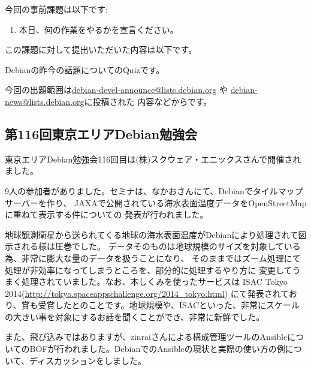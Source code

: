\documentclass[mingoth,a4paper]{jsarticle}
\begin{document}

今回の事前課題は以下です:
\begin{enumerate}
 \item 本日、何の作業をやるかを宣言ください。
\end{enumerate}
この課題に対して提出いただいた内容は以下です。
\begin{multicols}{2}
{\small

}
\end{multicols}


 Debianの昨今の話題についてのQuizです。

今回の出題範囲は\url{debian-devel-announce@lists.debian.org} や \url{debian-news@lists.debian.org}に投稿された
内容などからです。

\begin{multicols}{2}

\end{multicols}


\subsection{第116回東京エリアDebian勉強会}

 東京エリアDebian勉強会116回目は(株)スクウェア・エニックスさんで開催されました。
 
 9人の参加者がありました。セミナは、なかおさんにて、Debianでタイルマップサーバーを作り、
JAXAで公開されている海水表面温度データをOpenStreetMapに重ねて表示する件についての
発表が行われました。

 地球観測衛星から送られてくる地球の海水表面温度がDebianにより処理されて図示される様は圧巻でした。
データそのものは地球規模のサイズを対象している為、非常に膨大な量のデータを扱うことになり、
そのままではズーム処理にて処理が非効率になってしまうところを、部分的に処理するやり方に
変更してうまく処理されていました。なお、本しくみを使ったサービスは
ISAC Tokyo 2014(\url{http://tokyo.spaceappschallenge.org/2014_tokyo.html})
にて発表されており、賞も受賞したとのことです。地球規模や、ISACといった、非常にスケールの大きい事を対象にするお話を聞くことができ、非常に新鮮でした。

 また、飛び込みではありますが、zinraiさんによる構成管理ツールのAnsibleについてのBOFが行われました。DebianでのAnsibleの現状と実際の使い方の例について、ディスカッションをしました。
\end{document}
